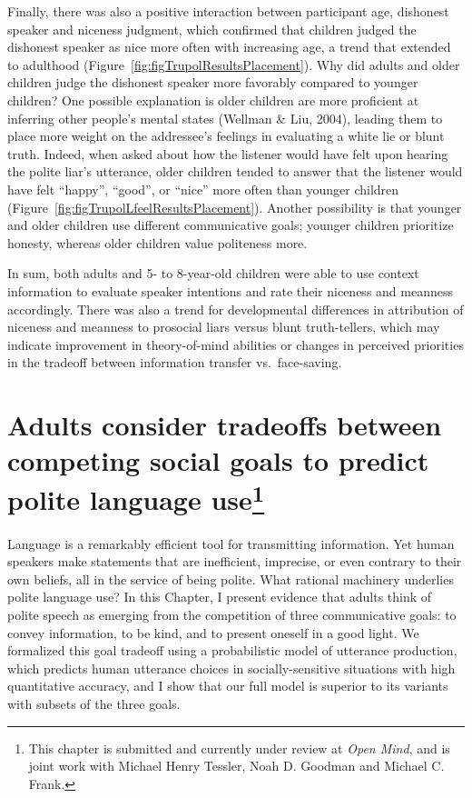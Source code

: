 \documentclass[oneside]{report}
\begin{document}
Finally, there was also a positive interaction between participant age,
dishonest speaker and niceness judgment, which confirmed that children
judged the dishonest speaker as nice more often with increasing age, a
trend that extended to adulthood
(Figure~\ref{fig:figTrupolResultsPlacement}). Why did adults and older
children judge the dishonest speaker more favorably compared to younger
children? One possible explanation is older children are more proficient
at inferring other people's mental states (Wellman \& Liu, 2004),
leading them to place more weight on the addressee's feelings in
evaluating a white lie or blunt truth. Indeed, when asked about how the
listener would have felt upon hearing the polite liar's utterance, older
children tended to answer that the listener would have felt ``happy'',
``good'', or ``nice'' more often than younger children
(Figure~\ref{fig:figTrupolLfeelResultsPlacement}). Another possibility
is that younger and older children use different communicative goals;
younger children prioritize honesty, whereas older children value
politeness more.

In sum, both adults and 5- to 8-year-old children were able to use
context information to evaluate speaker intentions and rate their
niceness and meanness accordingly. There was also a trend for
developmental differences in attribution of niceness and meanness to
prosocial liars versus blunt truth-tellers, which may indicate
improvement in theory-of-mind abilities or changes in perceived
priorities in the tradeoff between information transfer vs.~face-saving.

\chapter[Adults consider tradeoffs between competing social goals to
predict polite language use]{\texorpdfstring{Adults consider tradeoffs
between competing social goals to predict polite language use\footnote{This
  chapter is submitted and currently under review at \emph{Open Mind},
  and is joint work with Michael Henry Tessler, Noah D. Goodman and
  Michael C. Frank.}}{Adults consider tradeoffs between competing social goals to predict polite language use}}\label{adults-consider-tradeoffs-between-competing-social-goals-to-predict-polite-language-use}


Language is a remarkably efficient tool for transmitting information.
Yet human speakers make statements that are inefficient, imprecise, or
even contrary to their own beliefs, all in the service of being polite.
What rational machinery underlies polite language use? In this Chapter,
I present evidence that adults think of polite speech as emerging from
the competition of three communicative goals: to convey information, to
be kind, and to present oneself in a good light. We formalized this goal
tradeoff using a probabilistic model of utterance production, which
predicts human utterance choices in socially-sensitive situations with
high quantitative accuracy, and I show that our full model is superior
to its variants with subsets of the three goals.
\end{document}
